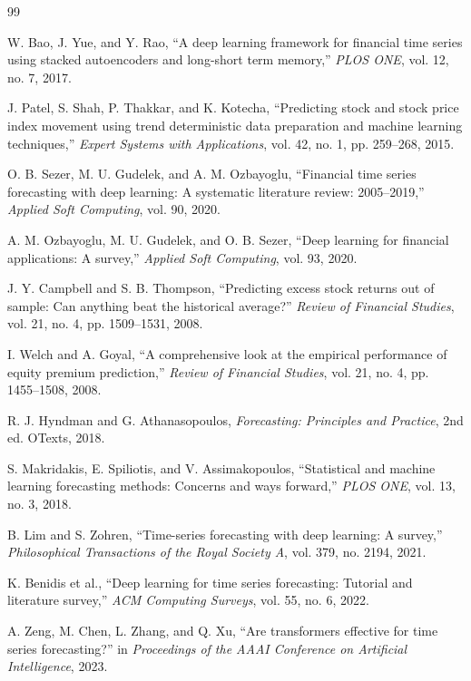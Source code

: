 \documentclass[11pt]{article}
\begin{document}
\begin{thebibliography}{99}

W. Bao, J. Yue, and Y. Rao, ``A deep learning framework for financial time series using stacked autoencoders and long-short term memory,'' \emph{PLOS ONE}, vol. 12, no. 7, 2017.

J. Patel, S. Shah, P. Thakkar, and K. Kotecha, ``Predicting stock and stock price index movement using trend deterministic data preparation and machine learning techniques,'' \emph{Expert Systems with Applications}, vol. 42, no. 1, pp. 259--268, 2015.

O. B. Sezer, M. U. Gudelek, and A. M. Ozbayoglu, ``Financial time series forecasting with deep learning: A systematic literature review: 2005--2019,'' \emph{Applied Soft Computing}, vol. 90, 2020.

A. M. Ozbayoglu, M. U. Gudelek, and O. B. Sezer, ``Deep learning for financial applications: A survey,'' \emph{Applied Soft Computing}, vol. 93, 2020.

J. Y. Campbell and S. B. Thompson, ``Predicting excess stock returns out of sample: Can anything beat the historical average?'' \emph{Review of Financial Studies}, vol. 21, no. 4, pp. 1509--1531, 2008.

I. Welch and A. Goyal, ``A comprehensive look at the empirical performance of equity premium prediction,'' \emph{Review of Financial Studies}, vol. 21, no. 4, pp. 1455--1508, 2008.

R. J. Hyndman and G. Athanasopoulos, \emph{Forecasting: Principles and Practice}, 2nd ed. OTexts, 2018.

S. Makridakis, E. Spiliotis, and V. Assimakopoulos, ``Statistical and machine learning forecasting methods: Concerns and ways forward,'' \emph{PLOS ONE}, vol. 13, no. 3, 2018.

B. Lim and S. Zohren, ``Time-series forecasting with deep learning: A survey,'' \emph{Philosophical Transactions of the Royal Society A}, vol. 379, no. 2194, 2021.

K. Benidis et al., ``Deep learning for time series forecasting: Tutorial and literature survey,'' \emph{ACM Computing Surveys}, vol. 55, no. 6, 2022.

A. Zeng, M. Chen, L. Zhang, and Q. Xu, ``Are transformers effective for time series forecasting?'' in \emph{Proceedings of the AAAI Conference on Artificial Intelligence}, 2023.


\end{thebibliography}
\end{document}
